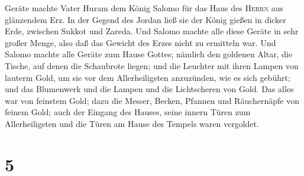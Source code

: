 Geräte machte Vater Huram dem König Salomo für das Haus des
\textsc{Herrn} aus glänzendem Erz.  In der Gegend des
Jordan ließ sie der König gießen in dicker Erde, zwischen Sukkot und
Zareda.  Und Salomo machte alle diese Geräte in sehr
großer Menge, also daß das Gewicht des Erzes nicht zu ermitteln war.
 Und Salomo machte alle Geräte zum Hause Gottes; nämlich
den goldenen Altar, die Tische, auf denen die Schaubrote liegen;
 und die Leuchter mit ihren Lampen von lauterm Gold, um
sie vor dem Allerheiligsten anzuzünden, wie es sich gebührt;
 und das Blumenwerk und die Lampen und die Lichtscheren
von Gold. Das alles war von feinstem Gold;  dazu die
Messer, Becken, Pfannen und Räuchernäpfe von feinem Gold; auch der
Eingang des Hauses, seine innern Türen zum Allerheiligsten und die Türen
am Hause des Tempels waren vergoldet.

\hypertarget{section-4}{%
\section{5}\label{section-4}}

